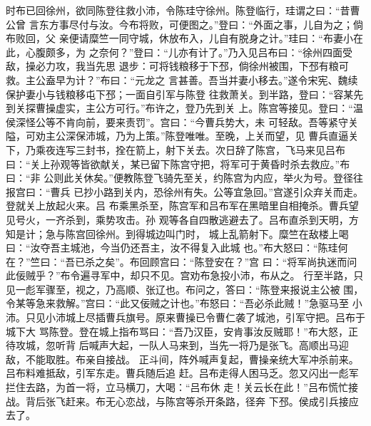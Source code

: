 时布已回徐州，欲同陈登往救小沛，令陈珪守徐州。陈登临行，珪谓之曰：“昔曹公曾
言东方事尽付与汝。今布将败，可便图之。”登曰：“外面之事，儿自为之；倘布败回，父
亲便请糜竺一同守城，休放布入，儿自有脱身之计。”珪曰：“布妻小在此，心腹颇多，为
之奈何？”登曰：“儿亦有计了。”乃入见吕布曰：“徐州四面受敌，操必力攻，我当先思
退步：可将钱粮移于下邳，倘徐州被围，下邳有粮可救。主公盍早为计？”布曰：“元龙之
言甚善。吾当并妻小移去。”遂令宋宪、魏续保护妻小与钱粮移屯下邳；一面自引军与陈登
往救萧关。到半路，登曰：“容某先到关探曹操虚实，主公方可行。”布许之，登乃先到关
上。陈宫等接见。登曰：“温侯深怪公等不肯向前，要来责罚”。宫曰：“今曹兵势大，未
可轻敌。吾等紧守关隘，可劝主公深保沛城，乃为上策。”陈登唯唯。至晚，上关而望，见
曹兵直逼关下，乃乘夜连写三封书，拴在箭上，射下关去。次日辞了陈宫，飞马来见吕布
曰：“关上孙观等皆欲献关，某已留下陈宫守把，将军可于黄昏时杀去救应。”布曰：“非
公则此关休矣。”便教陈登飞骑先至关，约陈宫为内应，举火为号。登径往报宫曰：“曹兵
已抄小路到关内，恐徐州有失。公等宜急回。”宫遂引众弃关而走。登就关上放起火来。吕
布乘黑杀至，陈宫军和吕布军在黑暗里自相掩杀。曹兵望见号火，一齐杀到，乘势攻击。孙
观等各自四散逃避去了。吕布直杀到天明，方知是计；急与陈宫回徐州。到得城边叫门时，
城上乱箭射下。糜竺在敌楼上喝曰：“汝夺吾主城池，今当仍还吾主，汝不得复入此城
也。”布大怒曰：“陈珪何在？”竺曰：“吾已杀之矣”。布回顾宫曰：“陈登安在？”宫
曰：“将军尚执迷而问此佞贼乎？”布令遍寻军中，却只不见。宫劝布急投小沛，布从之。
行至半路，只见一彪军骤至，视之，乃高顺、张辽也。布问之，答曰：“陈登来报说主公被
围，令某等急来救解。”宫曰：“此又佞贼之计也。”布怒曰：“吾必杀此贼！”急驱马至
小沛。只见小沛城上尽插曹兵旗号。原来曹操已令曹仁袭了城池，引军守把。吕布于城下大
骂陈登。登在城上指布骂曰：“吾乃汉臣，安肯事汝反贼耶！”布大怒，正待攻城，忽听背
后喊声大起，一队人马来到，当先一将乃是张飞。高顺出马迎敌，不能取胜。布亲自接战。
正斗间，阵外喊声复起，曹操亲统大军冲杀前来。吕布料难抵敌，引军东走。曹兵随后追
赶。吕布走得人困马乏。忽又闪出一彪军拦住去路，为首一将，立马横刀，大喝：“吕布休
走！关云长在此！”吕布慌忙接战。背后张飞赶来。布无心恋战，与陈宫等杀开条路，径奔
下邳。侯成引兵接应去了。

